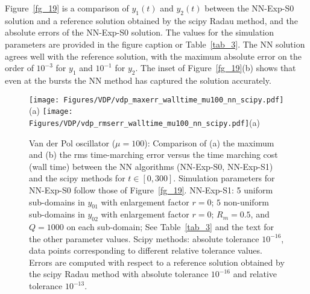 Figure~\ref{fg_19} is a comparison of $y_1(t)$ and $y_2(t)$
between the NN-Exp-S0 solution and a reference solution obtained by
the scipy Radau method, and the absolute errors
of the NN-Exp-S0 solution.
The values for the simulation parameters are provided in the figure
caption or Table~\ref{tab_3}.
The NN solution agrees well with the reference solution,
with the maximum absolute error on the order of $10^{-3}$ for $y_1$
and $10^{-1}$ for $y_2$. The inset of Figure~\ref{fg_19}(b) shows that
even at the bursts the NN method has captured the solution
accurately. 


\begin{figure}
  \centerline{
    \texttt{[image: Figures/VDP/vdp\_maxerr\_walltime\_mu100\_nn\_scipy.pdf]}(a)
    \texttt{[image: Figures/VDP/vdp\_rmserr\_walltime\_mu100\_nn\_scipy.pdf]}(a)
  }
  \caption{Van der Pol oscillator ($\mu=100$):
    Comparison of (a) the maximum and (b) the rms time-marching error 
    versus the time marching cost (wall time) between the NN algorithms (NN-Exp-S0,
    NN-Exp-S1) and the scipy methods for $t\in[0,300]$.
    Simulation parameters for NN-Exp-S0 follow those of Figure~\ref{fg_19}.
    NN-Exp-S1:
    5 uniform sub-domains in $y_{01}$ with enlargement factor $r=0$;
    $5$ non-uniform sub-domains in $y_{02}$ with enlargement factor $r=0$;
    $R_m=0.5$, and $Q=1000$ on each sub-domain;
    See Table~\ref{tab_3} and the text for the other parameter values.
    Scipy methods:
    absolute tolerance
    $10^{-16}$, data points corresponding to different relative tolerance values.
    Errors are computed with respect to a
    reference solution obtained by the scipy Radau method with absolute tolerance
    $10^{-16}$ and relative tolerance $10^{-13}$.
  }
  \label{fg_20}
\end{figure}

